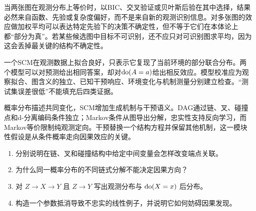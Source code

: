 当两张图在观测分布上等价时，以BIC、交叉验证或贝叶斯后验在其中选择，结果必然来自函数、先验或复杂度偏好，而不是来自新的观测识别信息。对多张图的效应做加权平均可以表达特定先验下的决策不确定性，但不等于它们在本体论上都“部分为真”。若某些候选图中目标不可识别，还不应只对可识别图求平均，因为这会丢掉最关键的结构不确定性。

\begin{failurecheck}[拟合检查代替了因果校准]
一个SCM在观测数据上拟合良好，只表示它复现了当前环境的部分联合分布。两个模型可以对预测给出相同答案，却对$\operatorname{do}(A=a)$给出相反效应。模型校准应为观察拟合、图含义的独立、已知干预响应、环境变化与机制测量分别建立检查。“测试集误差很低”不能填充后四类证据。
\end{failurecheck}

\begin{chapterreview}
概率分布描述共同变化，SCM增加生成机制与干预语义。DAG通过链、叉、碰撞点和d-分离编码条件独立；Markov条件从图导出分解，忠实性支持反向学习，而Markov等价限制纯观测定向。干预替换一个结构方程并保留其他机制，这一模块性假设是从条件概率走向因果效应的关键。
\end{chapterreview}

\begin{selfcheck}
\begin{enumerate}
  \item 分别说明在链、叉和碰撞结构中给定中间变量会怎样改变端点关联。
  \item 为什么同一概率分布的不同链式分解不能决定因果方向？
  \item 对 $Z\rightarrow X\rightarrow Y$ 且 $Z\rightarrow Y$ 写出观测分布与 $\operatorname{do}(X=x)$ 后分布。
  \item 构造一个参数抵消导致不忠实的线性例子，并说明它如何妨碍因果发现。
\end{enumerate}
\end{selfcheck}

